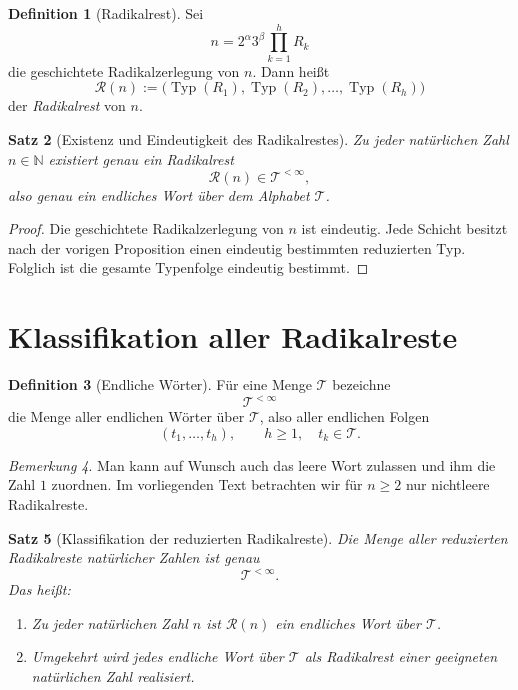 \documentclass[11pt,a4paper]{article}
\newtheorem{satz}{Satz}
\theoremstyle{definition}
\newtheorem{definition}[satz]{Definition}
\theoremstyle{remark}
\newtheorem{bemerkung}[satz]{Bemerkung}
\newcommand{\N}{\mathbb{N}}
\newcommand{\Typ}{\operatorname{Typ}}
\newcommand{\RRest}{\mathcal{R}}
\begin{document}
	\begin{definition}[Radikalrest]
		Sei
		\[
		n=2^\alpha 3^\beta \prod_{k=1}^{h}R_k
		\]
		die geschichtete Radikalzerlegung von \(n\). Dann heißt
		\[
		\RRest(n):=\bigl(\Typ(R_1),\Typ(R_2),\dots,\Typ(R_h)\bigr)
		\]
		der \emph{Radikalrest} von \(n\).
	\end{definition}
	
	\begin{satz}[Existenz und Eindeutigkeit des Radikalrestes]
		Zu jeder natürlichen Zahl \(n\in\N\) existiert genau ein Radikalrest
		\[
		\RRest(n)\in\mathcal T^{<\infty},
		\]
		also genau ein endliches Wort über dem Alphabet \(\mathcal T\).
	\end{satz}
	
	\begin{proof}
		Die geschichtete Radikalzerlegung von \(n\) ist eindeutig. Jede Schicht besitzt nach der vorigen
		Proposition einen eindeutig bestimmten reduzierten Typ. Folglich ist die gesamte Typenfolge
		eindeutig bestimmt.
	\end{proof}
	
	\section{Klassifikation aller Radikalreste}
	
	\begin{definition}[Endliche Wörter]
		Für eine Menge \(\mathcal T\) bezeichne
		\[
		\mathcal T^{<\infty}
		\]
		die Menge aller endlichen Wörter über \(\mathcal T\), also aller endlichen Folgen
		\[
		(t_1,\dots,t_h),\qquad h\ge 1,\quad t_k\in\mathcal T.
		\]
	\end{definition}
	
	\begin{bemerkung}
		Man kann auf Wunsch auch das leere Wort zulassen und ihm die Zahl \(1\) zuordnen. Im vorliegenden
		Text betrachten wir für \(n\ge 2\) nur nichtleere Radikalreste.
	\end{bemerkung}
	
	\begin{satz}[Klassifikation der reduzierten Radikalreste]
		Die Menge aller reduzierten Radikalreste natürlicher Zahlen ist genau
		\[
		\mathcal T^{<\infty}.
		\]
		Das heißt:
		\begin{enumerate}[label=\textup{(\roman*)}]
			\item Zu jeder natürlichen Zahl \(n\) ist \(\RRest(n)\) ein endliches Wort über \(\mathcal T\).
			\item Umgekehrt wird jedes endliche Wort über \(\mathcal T\) als Radikalrest einer geeigneten
			natürlichen Zahl realisiert.
		\end{enumerate}
	\end{satz}
	
\end{document}
